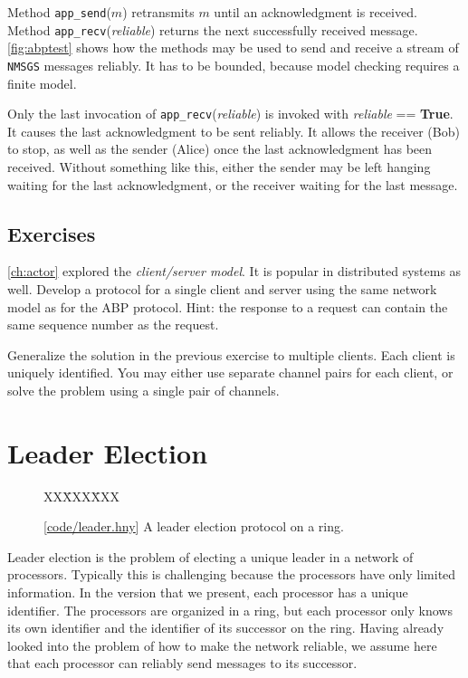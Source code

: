 \documentclass{report}
\newcommand{\harmonysource}[1]{
\begin{tabbing}
XX\=XXX\=XXX\kill
    
\end{tabbing}
}
\newcommand{\harmonylink}[1]{%
[\href{https://harmony.cs.cornell.edu/#1}{\underline{#1}}]%
}
\newenvironment{code}{
\tcolorbox
}{
\endtcolorbox
}
\begin{document}
Method \texttt{app\_send}($m$) retransmits $m$ until
an acknowledgment is received.
Method \texttt{app\_recv}(\textit{reliable}) returns the next successfully received
message.
\autoref{fig:abptest} shows how the methods may be used to send and receive
a stream of \texttt{NMSGS} messages reliably.
It has to be bounded, because model checking requires a finite model.

Only the last invocation of \texttt{app\_recv}(\textit{reliable}) is invoked with
\textit{reliable} == \textbf{True}.  It causes the last acknowledgment to be sent
reliably.  It allows the receiver (Bob) to stop, as well as the sender (Alice)
once the last acknowledgment has been received.
Without something like this, either the sender may be left hanging waiting
for the last acknowledgment, or the receiver waiting for the last message.

\section*{Exercises}
\begin{problems}
\item \autoref{ch:actor} explored the \emph{client/server model}.  It is popular
in distributed systems as well.
Develop a protocol for a single client and server using the same network
model as for the ABP protocol.
Hint: the response to a request can contain the same sequence number as the
request.
\item Generalize the solution in the previous exercise to multiple clients.
Each client is uniquely identified.  You may either use separate channel pairs
for each client, or solve the problem using a single pair of channels.
\end{problems}

\chapter{Leader Election}
\label{ch:leader}

\begin{figure}
\begin{code}
\harmonysource{leader}
\end{code}
\caption{\harmonylink{code/leader.hny} A leader election protocol on a ring.}
\label{fig:leader}
\end{figure}

Leader election is the problem of electing a unique leader in a
network of processors.  Typically this is challenging because the
processors have only limited information.  In the version that we
present, each processor has a unique identifier.  The processors
are organized in a ring, but each processor only knows its own
identifier and the identifier of its successor on the ring.  Having
already looked into the problem of how to make the network reliable,
we assume here that each processor can reliably send messages to
its successor.
\end{document}
